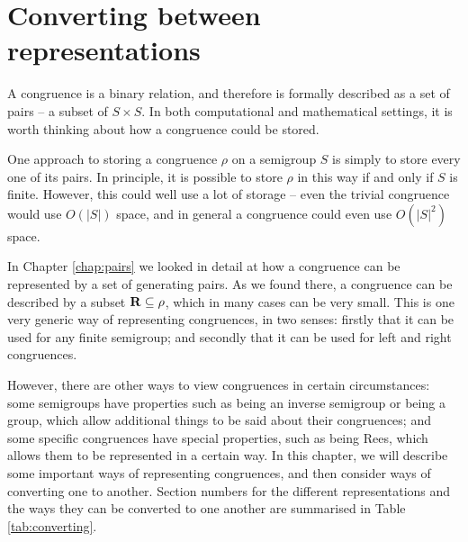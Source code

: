 \chapter{Converting between representations}
\label{chap:converting}

A congruence is a binary relation, and therefore is formally described as a set
of pairs -- a subset of $S \times S$.  In both computational and mathematical
settings, it is worth thinking about how a congruence could be stored.

One approach to storing a congruence $\rho$ on a semigroup $S$ is simply to
store every one of its pairs.  In principle, it is possible to store
$\rho$ in this way if and only if $S$ is finite.  However, this could well use a
lot of storage -- even the trivial congruence would use $O(|S|)$ space, and in
general a congruence could even use $O(|S|^2)$ space.

In Chapter \ref{chap:pairs} we looked in detail at how a congruence can be
represented by a set of generating pairs.  As we found there, a congruence can
be described by a subset $\mathbf{R} \subseteq \rho$, which in many cases can be
very small.  This is one very generic way of representing congruences, in two
senses: firstly that it can be used for any finite semigroup; and secondly that
it can be used for left and right congruences.

However, there are other ways to view congruences in certain circumstances: some
semigroups have properties such as being an inverse semigroup or being a group,
which allow additional things to be said about their congruences; and some
specific congruences have special properties, such as being Rees, which allows
them to be represented in a certain way.  In this chapter, we will describe some
important ways of representing congruences, and then consider ways of converting
one to another.  Section numbers for the different representations and the ways
they can be converted to one another are summarised in Table
\ref{tab:converting}.


